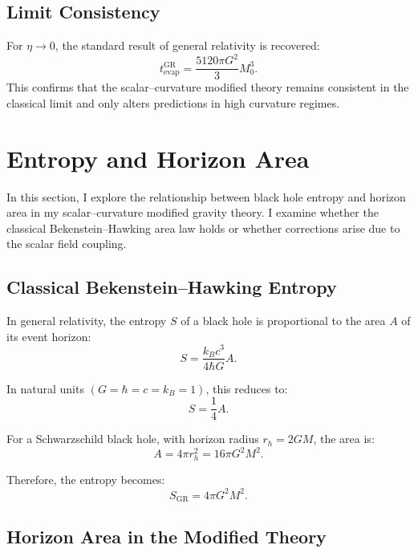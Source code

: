 \documentclass[12pt]{article}
\begin{document}
\subsection{Limit Consistency}

For \( \eta \to 0 \), the standard result of general relativity is recovered:
\[
t_{\text{evap}}^{\text{GR}} = \frac{5120\pi G^2}{3} M_0^3.
\]
This confirms that the scalar–curvature modified theory remains consistent in the classical limit and only alters predictions in high curvature regimes.

\section{Entropy and Horizon Area}

In this section, I explore the relationship between black hole entropy and horizon area in my scalar--curvature modified gravity theory. I examine whether the classical Bekenstein–Hawking area law holds or whether corrections arise due to the scalar field coupling.

\subsection{Classical Bekenstein–Hawking Entropy}

In general relativity, the entropy \( S \) of a black hole is proportional to the area \( A \) of its event horizon:
\begin{equation}
S = \frac{k_B c^3}{4\hbar G} A.
\end{equation}

In natural units \( (G = \hbar = c = k_B = 1) \), this reduces to:
\begin{equation}
S = \frac{1}{4} A.
\end{equation}

For a Schwarzschild black hole, with horizon radius \( r_h = 2GM \), the area is:
\begin{equation}
A = 4\pi r_h^2 = 16\pi G^2 M^2.
\end{equation}

Therefore, the entropy becomes:
\begin{equation}
S_{\text{GR}} = 4\pi G^2 M^2.
\end{equation}

\subsection{Horizon Area in the Modified Theory}
\end{document}

